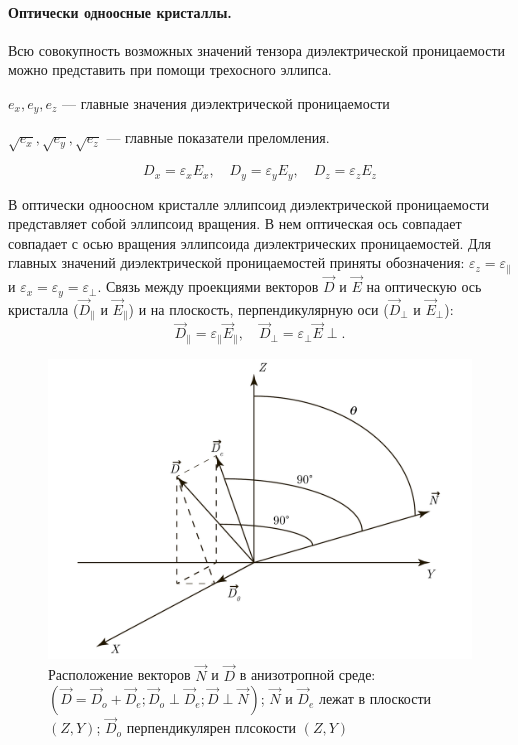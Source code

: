 \documentclass[a4paper, 12pt]{article}
\begin{document}
	\paragraph{Оптически одноосные кристаллы.}
	Всю совокупность возможных значений тензора диэлектрической проницаемости можно представить при помощи трехосного эллипса.\par
	$e_x,e_y,e_z$ — главные значения диэлектрической проницаемости\par
	$\sqrt{e_x},\sqrt{e_y},\sqrt{e_z}$ — главные показатели преломления.\par
	\begin{equation}
		D_x=\varepsilon_xE_x,\quad D_y=\varepsilon_yE_y,\quad D_z=\varepsilon_zE_z
	\end{equation}\par
	В оптически одноосном кристалле эллипсоид диэлектрической проницаемости представляет собой эллипсоид вращения. В нем оптическая ось совпадает совпадает с осью вращения эллипсоида диэлектрических проницаемостей. Для главных значений диэлектрической проницаемостей приняты обозначения: $\varepsilon_z=\varepsilon_\parallel$ и $\varepsilon_x=\varepsilon_y=\varepsilon_\perp$. Связь между проекциями векторов $\vec{D}$ и $\vec{E}$ на оптическую ось кристалла ($\vec{D}_\parallel$ и $\vec{E}_\parallel$) и на плоскость, перпендикулярную оси ($\vec{D}_\perp$ и $\vec{E}_\perp$):
	\begin{equation}
		\vec{D}_\parallel=\varepsilon_\parallel\vec{E}_\parallel,\quad \vec{D}_\perp=\varepsilon_\perp\vec{E}\perp.
		\label{eq:4}
	\end{equation}
	\par
	\begin{figure}
		\includegraphics[scale=0.26]{ND_Location.pdf}
		\caption{Расположение векторов $\vec{N}$ и $\vec{D}$ в анизотропной среде: $\left(\vec{D}=\vec{D}_o+\vec{D}_e; \vec{D}_o\perp\vec{D}_e;\vec{D}\perp\vec{N}\right)$; $\vec{N}$ и $\vec{D}_e$ лежат в плоскости  $(Z,Y)$; $\vec{D}_o$ перпендикулярен плсокости $(Z,Y)$}
		\label{fig:ND_Location}
	\end{figure}
\end{document}
